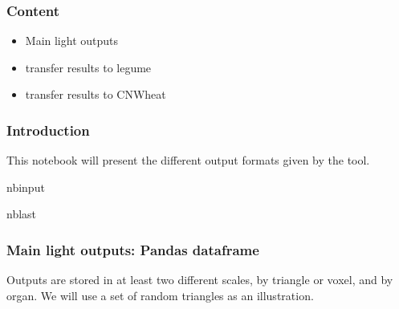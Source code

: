\documentclass[letterpaper,10pt,english]{sphinxmanual}
\begin{document}
\subsubsection{Content}
\label{\detokenize{outputs_and_plantmodels_transfer:Content}}\begin{itemize}
\item {} 
\sphinxAtStartPar
Main light outputs

\item {} 
\sphinxAtStartPar
transfer results to l\sphinxhyphen{}egume

\item {} 
\sphinxAtStartPar
transfer results to CN\sphinxhyphen{}Wheat

\end{itemize}


\subsubsection{Introduction}
\label{\detokenize{outputs_and_plantmodels_transfer:Introduction}}
\sphinxAtStartPar
This notebook will present the different output formats given by the tool.

\begin{sphinxuseclass}{nbinput}
\begin{sphinxuseclass}{nblast}
{
\begin{sphinxVerbatim}[commandchars=\\\{\}]
\llap{\color{nbsphinxin}[1]:\,\hspace{\fboxrule}\hspace{\fboxsep}}   
   
   
\end{sphinxVerbatim}
}

\end{sphinxuseclass}
\end{sphinxuseclass}

\subsubsection{Main light outputs: Pandas dataframe}
\label{\detokenize{outputs_and_plantmodels_transfer:Main-light-outputs:-Pandas-dataframe}}
\sphinxAtStartPar
Outputs are stored in at least two different scales, by triangle or voxel, and by organ. We will use a set of random triangles as an illustration.
\end{document}
